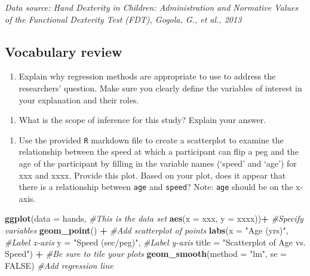 \documentclass[
]{report}
\newenvironment{Shaded}{\begin{snugshade}}{\end{snugshade}}
\newcommand{\CommentTok}[1]{\textcolor[rgb]{0.56,0.35,0.01}{\textit{#1}}}
\newcommand{\DataTypeTok}[1]{\textcolor[rgb]{0.13,0.29,0.53}{#1}}
\newcommand{\KeywordTok}[1]{\textcolor[rgb]{0.13,0.29,0.53}{\textbf{#1}}}
\newcommand{\NormalTok}[1]{#1}
\newcommand{\OperatorTok}[1]{\textcolor[rgb]{0.81,0.36,0.00}{\textbf{#1}}}
\newcommand{\OtherTok}[1]{\textcolor[rgb]{0.56,0.35,0.01}{#1}}
\newcommand{\StringTok}[1]{\textcolor[rgb]{0.31,0.60,0.02}{#1}}
\providecommand{\tightlist}{%
  \setlength{\itemsep}{0pt}\setlength{\parskip}{0pt}}
\begin{document}
\emph{Data source: Hand Dexterity in Children: Administration and Normative Values of the Functional Dexterity Test (FDT), Gogola, G., et al., 2013}

\hypertarget{vocabulary-review}{%
\subsection{Vocabulary review}\label{vocabulary-review}}

\begin{enumerate}
\def\labelenumi{\arabic{enumi}.}
\tightlist
\item
  Explain why regression methods are appropriate to use to address the researchers' question. Make sure you clearly define the variables of interest in your explanation and their roles.
\end{enumerate}

\vspace{1in}

\begin{enumerate}
\def\labelenumi{\arabic{enumi}.}
\setcounter{enumi}{1}
\tightlist
\item
  What is the scope of inference for this study? Explain your answer.
\end{enumerate}

\vspace{1in}

\begin{enumerate}
\def\labelenumi{\arabic{enumi}.}
\setcounter{enumi}{2}
\tightlist
\item
  Use the provided \texttt{R} markdown file to create a scatterplot to examine the relationship between the speed at which a participant can flip a peg and the age of the participant by filling in the variable names (`speed' and `age') for xxx and xxxx. Provide this plot. Based on your plot, does it appear that there is a relationship between \texttt{age} and \texttt{speed}? Note: \texttt{age} should be on the x-axis.
\end{enumerate}

\begin{Shaded}
\begin{Highlighting}[]
    \KeywordTok{ggplot}\NormalTok{(}\DataTypeTok{data =}\NormalTok{ hands,   }\CommentTok{\#This is the data set}
       \KeywordTok{aes}\NormalTok{(}\DataTypeTok{x =}\NormalTok{ xxx, }\DataTypeTok{y =}\NormalTok{ xxxx))}\OperatorTok{+}\StringTok{  }\CommentTok{\#Specify variables}
\StringTok{    }\KeywordTok{geom\_point}\NormalTok{() }\OperatorTok{+}\StringTok{  }\CommentTok{\#Add scatterplot of points}
\StringTok{    }\KeywordTok{labs}\NormalTok{(}\DataTypeTok{x =} \StringTok{"Age (yrs)"}\NormalTok{,  }\CommentTok{\#Label x{-}axis}
       \DataTypeTok{y =} \StringTok{"Speed (sec/peg)"}\NormalTok{,  }\CommentTok{\#Label y{-}axis}
       \DataTypeTok{title =} \StringTok{"Scatterplot of Age vs. Speed"}\NormalTok{) }\OperatorTok{+}\StringTok{ }\CommentTok{\#Be sure to tile your plots}
\StringTok{    }\KeywordTok{geom\_smooth}\NormalTok{(}\DataTypeTok{method =} \StringTok{"lm"}\NormalTok{, }\DataTypeTok{se =} \OtherTok{FALSE}\NormalTok{)  }\CommentTok{\#Add regression line}
\end{Highlighting}
\end{Shaded}
\end{document}
